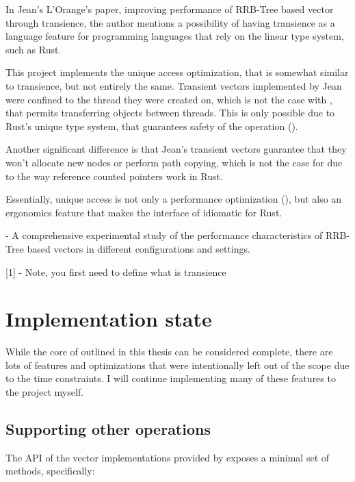 In Jean's L'Orange's paper, improving performance of RRB-Tree based vector through transience, the author mentions a possibility of having transience as a language feature for programming languages that rely on the linear type system, such as Rust. 

This project implements the unique access optimization, that is somewhat similar to transience, but not entirely the same. Transient vectors implemented by Jean were confined to the thread they were created on, which is not the case with \pvecrs{}, that permits transferring objects between threads. This is only possible due to Rust's unique type system, that guarantees safety of the operation ().

Another significant difference is that Jean's transient vectors guarantee that they won't allocate new nodes or perform path copying, which is not the case for 
\pvecrs{} due to the way reference counted pointers work in Rust. 

Essentially, unique access is not only a performance optimization (), but also an ergonomics feature that makes the interface of \pvecrs{} idiomatic for Rust. 



- A comprehensive experimental study of the performance characteristics of RRB-Tree based vectors in different configurations and settings.

[1] - Note, you first need to define what is transience

\section{Implementation state}

While the core of \pvecrs{} outlined in this thesis can be considered complete, there are lots of features and optimizations that were intentionally left out of the scope due to the time constraints. I will continue implementing many of these features to the project myself. 

\subsection{Supporting other operations}
The API of the vector implementations provided by \pvecrs{} exposes a minimal set of methods, specifically:

